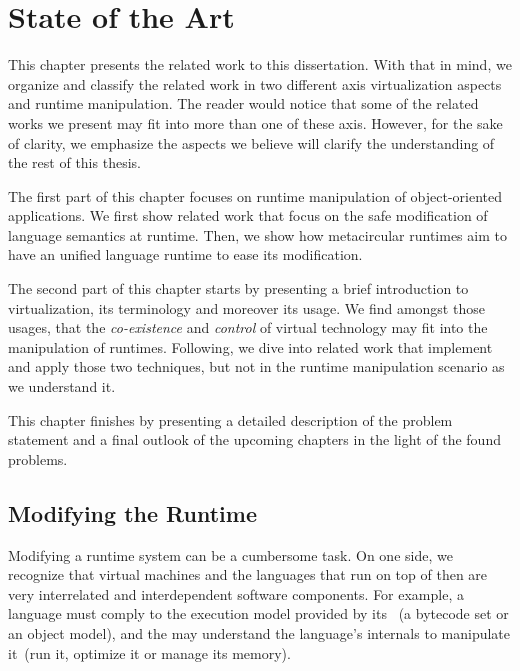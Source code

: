 
\chapter{State of the Art}
\minitoc
\introduction

This chapter presents the related work to this dissertation. With that in mind, we organize and classify the related work in two different axis \ie virtualization aspects and runtime manipulation. The reader would notice that some of the related works we present may fit into more than one of these axis. However, for the sake of clarity, we emphasize the aspects we believe will clarify the understanding of the rest of this thesis.

The first part of this chapter focuses on runtime manipulation of object-oriented applications. We first show related work that focus on the safe modification of language semantics at runtime. Then, we show how metacircular runtimes aim to have an unified language runtime to ease its modification. 

The second part of this chapter starts by presenting a brief introduction to virtualization, its terminology and moreover its usage. We find amongst those usages, that the \emph{co-existence} and \emph{control} of virtual technology may fit into the manipulation of runtimes.
Following, we dive into related work that implement and apply those two techniques, but not in the runtime manipulation scenario as we understand it.

This chapter finishes by presenting a detailed description of the problem statement and a final outlook of the upcoming chapters in the light of the found problems.


\newpage

\section{Modifying the Runtime}
Modifying a runtime system can be a cumbersome task. On one side, we recognize that virtual machines and the languages that run on top of then are very interrelated and interdependent software components. For example, a language must comply to the execution model provided by its \VM~(\eg a bytecode set or an object model), and the \VM may understand the language's internals to manipulate it~(\eg run it, optimize it or manage its memory).

